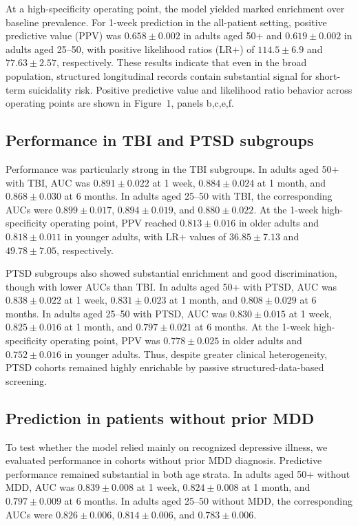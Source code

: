 \documentclass[onecolumn, compsoc,11pt]{IEEEtran}
\begin{document}
At a high-specificity operating point, the model yielded marked enrichment over baseline prevalence. For 1-week prediction in the all-patient setting, positive predictive value (PPV) was $0.658 \pm 0.002$ in adults aged 50+ and $0.619 \pm 0.002$ in adults aged 25--50, with positive likelihood ratios (LR$+$) of $114.5 \pm 6.9$ and $77.63 \pm 2.57$, respectively. These results indicate that even in the broad population, structured longitudinal records contain substantial signal for short-term suicidality risk.
Positive predictive value and likelihood ratio behavior across operating points are shown in Figure~1, panels b,c,e,f.

\subsection*{Performance in TBI and PTSD subgroups}
Performance was particularly strong in the TBI subgroups. In adults aged 50+ with TBI, AUC was $0.891 \pm 0.022$ at 1 week, $0.884 \pm 0.024$ at 1 month, and $0.868 \pm 0.030$ at 6 months. In adults aged 25--50 with TBI, the corresponding AUCs were $0.899 \pm 0.017$, $0.894 \pm 0.019$, and $0.880 \pm 0.022$. At the 1-week high-specificity operating point, PPV reached $0.813 \pm 0.016$ in older adults and $0.818 \pm 0.011$ in younger adults, with LR$+$ values of $36.85 \pm 7.13$ and $49.78 \pm 7.05$, respectively.

PTSD subgroups also showed substantial enrichment and good discrimination, though with lower AUCs than TBI. In adults aged 50+ with PTSD, AUC was $0.838 \pm 0.022$ at 1 week, $0.831 \pm 0.023$ at 1 month, and $0.808 \pm 0.029$ at 6 months. In adults aged 25--50 with PTSD, AUC was $0.830 \pm 0.015$ at 1 week, $0.825 \pm 0.016$ at 1 month, and $0.797 \pm 0.021$ at 6 months. At the 1-week high-specificity operating point, PPV was $0.778 \pm 0.025$ in older adults and $0.752 \pm 0.016$ in younger adults. Thus, despite greater clinical heterogeneity, PTSD cohorts remained highly enrichable by passive structured-data-based screening.

\subsection*{Prediction in patients without prior MDD}

To test whether the model relied mainly on recognized depressive illness, we evaluated performance in cohorts without prior MDD diagnosis. Predictive performance remained substantial in both age strata. In adults aged 50+ without MDD, AUC was $0.839 \pm 0.008$ at 1 week, $0.824 \pm 0.008$ at 1 month, and $0.797 \pm 0.009$ at 6 months. In adults aged 25--50 without MDD, the corresponding AUCs were $0.826 \pm 0.006$, $0.814 \pm 0.006$, and $0.783 \pm 0.006$.
\end{document}
